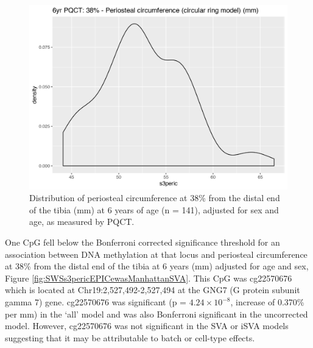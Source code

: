\documentclass[
]{book}
\begin{document}
\begin{figure}

{\centering \includegraphics[width=0.8\linewidth]{figs/SWSs3peric} 

}

\caption{Distribution of periosteal circumference at 38\% from the distal end of the tibia (mm) at 6 years of age (n = 141), adjusted for sex and age, as measured by PQCT.}\label{fig:SWSs3peric}
\end{figure}



One CpG fell below the Bonferroni corrected significance threshold for an association between DNA methylation at that locus and periosteal circumference at 38\% from the distal end of the tibia at 6 years (mm) adjusted for age and sex, Figure \ref{fig:SWSs3pericEPICewasManhattanSVA}. This CpG was cg22570676 which is located at Chr19:2,527,492-2,527,494 at the GNG7 (G protein subunit gamma 7) gene. cg22570676 was significant (p = \(4.24\times 10^{-8}\), increase of 0.370\% per mm) in the `all' model and was also Bonferroni significant in the uncorrected model. However, cg22570676 was not significant in the SVA or iSVA models suggesting that it may be attributable to batch or cell-type effects.
\end{document}

